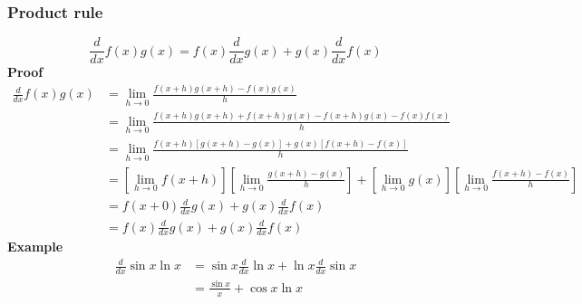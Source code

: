 \documentclass{article}
\begin{document}
\subsubsection{Product rule}
\begin{equation*}
    \frac{d}{dx} f( x) g( x) =f( x)\frac{d}{dx} g( x) +g( x)\frac{d}{dx} f( x)
\end{equation*}
\textbf{Proof}
\begin{equation*}
\begin{aligned}
\frac{d}{dx} f( x) g( x) & =\lim _{h\rightarrow 0}\frac{f( x+h) g( x+h) -f( x) g( x)}{h}\\
 & = \lim_{h\rightarrow 0}\frac{f(x+h)g(x+h)+f(x+h)g(x)-f(x+h)g(x)-f(x)f(x)}{h}\\
 & =\lim _{h\rightarrow 0}\frac{f( x+h)[ g( x+h) -g( x)] +g( x)[ f( x+h) -f( x)]}{h}\\
 & =\left[\lim _{h\rightarrow 0} f( x+h)\right]\left[\lim _{h\rightarrow 0}\frac{g( x+h) -g( x)}{h}\right] +\left[\lim _{h\rightarrow 0} g( x)\right]\left[\lim _{h\rightarrow 0}\frac{f( x+h) -f( x)}{h}\right]\\
 & =f( x+0)\frac{d}{dx} g( x) +g( x)\frac{d}{dx} f( x)\\
 & =f( x)\frac{d}{dx} g( x) +g( x)\frac{d}{dx} f( x)
\end{aligned}
\end{equation*}
\textbf{Example}
\begin{equation*}
\begin{aligned}
    \frac{d}{dx}\sin x\ln x & =\sin x\frac{d}{dx}\ln x+\ln x\frac{d}{dx}\sin x\\
     & =\frac{\sin x}{x} +\cos x\ln x
\end{aligned}
\end{equation*}
\end{document}
